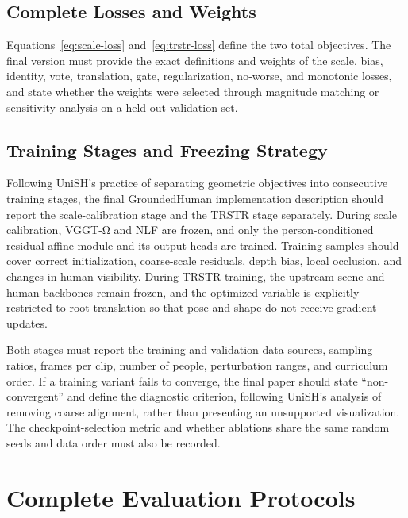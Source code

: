 \subsection{Complete Losses and Weights}

Equations~\ref{eq:scale-loss} and~\ref{eq:trstr-loss} define the two total objectives. The final version must provide the exact definitions and weights of the scale, bias, identity, vote, translation, gate, regularization, no-worse, and monotonic losses, and state whether the weights were selected through magnitude matching or sensitivity analysis on a held-out validation set.


\subsection{Training Stages and Freezing Strategy}

Following UniSH's practice of separating geometric objectives into consecutive training stages, the final GroundedHuman implementation description should report the scale-calibration stage and the TRSTR stage separately. During scale calibration, VGGT-Ω and NLF are frozen, and only the person-conditioned residual affine module and its output heads are trained. Training samples should cover correct initialization, coarse-scale residuals, depth bias, local occlusion, and changes in human visibility. During TRSTR training, the upstream scene and human backbones remain frozen, and the optimized variable is explicitly restricted to root translation so that pose and shape do not receive gradient updates.

Both stages must report the training and validation data sources, sampling ratios, frames per clip, number of people, perturbation ranges, and curriculum order. If a training variant fails to converge, the final paper should state ``non-convergent'' and define the diagnostic criterion, following UniSH's analysis of removing coarse alignment, rather than presenting an unsupported visualization. The checkpoint-selection metric and whether ablations share the same random seeds and data order must also be recorded.

\section{Complete Evaluation Protocols}
\label{app:evaluation}

